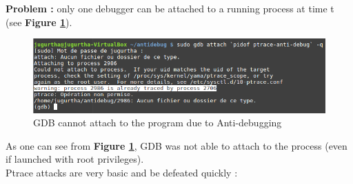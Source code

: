 \textbf{\color{red}Problem : } only one debugger can be attached to a running process at time t (see \textbf{Figure \ref{GDB cannot attach to the program due to Anti-debugging}}).
    		\begin{figure}[H]
					\centering
        			\includegraphics[scale=0.45]{img/solution/gdb-cannot-be-attached.png}
        			\caption{GDB cannot attach to the program due to Anti-debugging}
        			\label{GDB cannot attach to the program due to Anti-debugging}
   			 \end{figure}
   			 As one can see from \textbf{Figure \ref{GDB cannot attach to the program due to Anti-debugging}}, GDB was not able to attach to the process (even if launched with root privileges).\\
   			 
Ptrace attacks are very basic and be defeated quickly :




